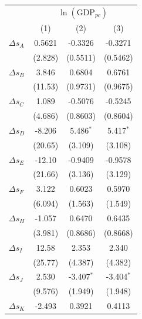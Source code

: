 \begingroup
\centering
\begin{tabular}{lccc}
   \toprule
    & \multicolumn{3}{c}{$\ln(\text{GDP}_{pc})$}\\
                                     & (1)           & (2)           & (3)\\  
   \midrule 
   $\Delta s_A$                      & 0.5621        & -0.3326       & -0.3271\\   
                                     & (2.828)       & (0.5511)      & (0.5462)\\   
   $\Delta s_B$                      & 3.846         & 0.6804        & 0.6761\\   
                                     & (11.53)       & (0.9731)      & (0.9675)\\   
   $\Delta s_C$                      & 1.089         & -0.5076       & -0.5245\\   
                                     & (4.686)       & (0.8603)      & (0.8604)\\   
   $\Delta s_D$                      & -8.206        & 5.486$^{*}$   & 5.417$^{*}$\\   
                                     & (20.65)       & (3.109)       & (3.108)\\   
   $\Delta s_E$                      & -12.10        & -0.9409       & -0.9578\\   
                                     & (21.66)       & (3.136)       & (3.129)\\   
   $\Delta s_F$                      & 3.122         & 0.6023        & 0.5970\\   
                                     & (6.094)       & (1.563)       & (1.549)\\   
   $\Delta s_H$                      & -1.057        & 0.6470        & 0.6435\\   
                                     & (3.981)       & (0.8686)      & (0.8668)\\   
   $\Delta s_I$                      & 12.58         & 2.353         & 2.340\\   
                                     & (25.77)       & (4.387)       & (4.382)\\   
   $\Delta s_J$                      & 2.530         & -3.407$^{*}$  & -3.404$^{*}$\\   
                                     & (9.576)       & (1.949)       & (1.948)\\   
   $\Delta s_K$                      & -2.493        & 0.3921        & 0.4113\\   

\end{tabular}
